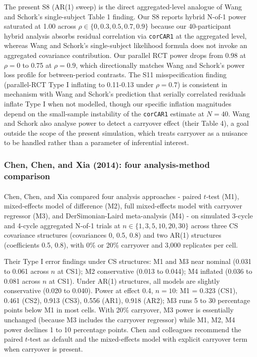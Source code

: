 \documentclass[
  11pt,
]{article}
\begin{document}
The present S8 (AR(1) sweep) is the direct aggregated-level analogue of
Wang and Schork's single-subject Table 1 finding. Our S8 reports hybrid
N-of-1 power saturated at 1.00 across
\(\rho \in \{0, 0.3, 0.5, 0.7, 0.9\}\) because our 40-participant hybrid
analysis absorbs residual correlation via \texttt{corCAR1} at the
aggregated level, whereas Wang and Schork's single-subject likelihood
formula does not invoke an aggregated covariance contribution. Our
parallel RCT power drops from 0.98 at \(\rho = 0\) to 0.75 at
\(\rho = 0.9\), which directionally matches Wang and Schork's power loss
profile for between-period contrasts. The S11 misspecification finding
(parallel-RCT Type I inflating to 0.11-0.13 under \(\rho = 0.7\)) is
consistent in mechanism with Wang and Schork's prediction that serially
correlated residuals inflate Type I when not modelled, though our
specific inflation magnitudes depend on the small-sample instability of
the \texttt{corCAR1} estimate at \(N = 40\). Wang and Schork also
analyse power to detect a carryover effect (their Table 4), a goal
outside the scope of the present simulation, which treats carryover as a
nuisance to be handled rather than a parameter of inferential interest.

\subsubsection{Chen, Chen, and Xia (2014): four analysis-method
comparison}\label{chen-chen-and-xia-2014-four-analysis-method-comparison}

Chen, Chen, and
Xia\textsuperscript{}
compared four analysis approaches - paired \(t\)-test (M1),
mixed-effects model of difference (M2), full mixed-effects model with
carryover regressor (M3), and DerSimonian-Laird meta-analysis (M4) - on
simulated 3-cycle and 4-cycle aggregated N-of-1 trials at
\(n \in \{1, 3, 5, 10, 20, 30\}\) across three CS covariance structures
(covariances 0, 0.5, 0.8) and two AR(1) structures (coefficients 0.5,
0.8), with 0\% or 20\% carryover and 3,000 replicates per cell.

Their Type I error findings under CS structures: M1 and M3 near nominal
(0.031 to 0.061 across \(n\) at CS1); M2 conservative (0.013 to 0.044);
M4 inflated (0.036 to 0.081 across \(n\) at CS1). Under AR(1)
structures, all models are slightly conservative (0.020 to 0.040). Power
at effect 0.4, \(n = 10\): M1 = 0.323 (CS1), 0.461 (CS2), 0.913 (CS3),
0.556 (AR1), 0.918 (AR2); M3 runs 5 to 30 percentage points below M1 in
most cells. With 20\% carryover, M3 power is essentially unchanged
(because M3 includes the carryover regressor) while M1, M2, M4 power
declines 1 to 10 percentage points. Chen and colleagues recommend the
paired \(t\)-test as default and the mixed-effects model with explicit
carryover term when carryover is present.
\end{document}
